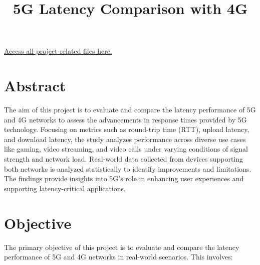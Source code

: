 \documentclass[conference]{IEEEtran}
\begin{document}
\title{
{ 5G Latency Comparison with 4G
}
}

\author{
\and
{}
\and
{}
}

\maketitle
\href{https://github.com/IIITV-5G-and-Edge-Computing-Activity/5G-Latency-Comparison-with-4G}{Access all project-related files here.}
\section{Abstract}
The aim of this project is to evaluate and compare the latency performance of 5G and 4G networks to assess the advancements in response times provided by 5G technology. Focusing on metrics such as round-trip time (RTT), upload latency, and download latency, the study analyzes performance across diverse use cases like gaming, video streaming, and video calls under varying conditions of signal strength and network load. Real-world data collected from devices supporting both networks is analyzed statistically to identify improvements and limitations. The findings provide insights into 5G’s role in enhancing user experiences and supporting latency-critical applications.
\section*{Objective}
The primary objective of this project is to evaluate and compare the latency performance of 5G and 4G networks in real-world scenarios. This involves:
\end{document}
